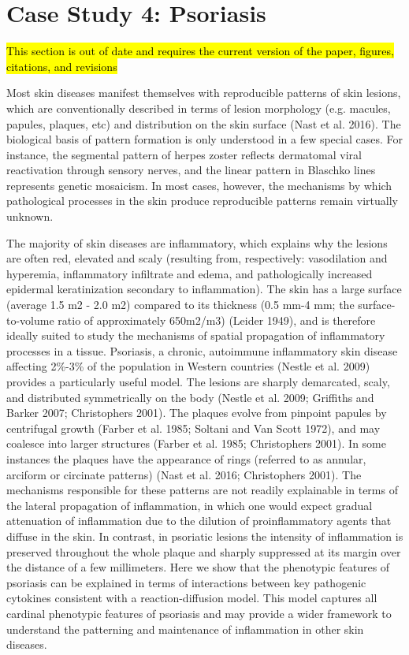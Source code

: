 \chapter{Case Study 4: Psoriasis}

\hl{This section is out of date and requires the current version of the paper, figures, citations, and revisions}

Most skin diseases manifest themselves with reproducible patterns of skin lesions, which are conventionally described in terms of lesion morphology (e.g. macules, papules, plaques, etc) and distribution on the skin surface (Nast et al. 2016). The biological basis of pattern formation is only understood in a few special cases. For instance, the segmental pattern of herpes zoster reflects dermatomal viral reactivation through sensory nerves, and the linear pattern in Blaschko lines represents genetic mosaicism. In most cases, however, the mechanisms by which pathological processes in the skin produce reproducible patterns remain virtually unknown. 

The majority of skin diseases are inflammatory, which explains why the lesions are often red, elevated and scaly (resulting from, respectively:  vasodilation and hyperemia, inflammatory infiltrate and edema, and pathologically increased epidermal keratinization secondary to inflammation). The skin has a large surface (average 1.5 m2 - 2.0 m2) compared to its thickness (0.5 mm-4 mm; the surface-to-volume ratio of approximately 650m2/m3) (Leider 1949), and is therefore ideally suited to study the mechanisms of spatial propagation of inflammatory processes in a tissue. Psoriasis, a chronic, autoimmune inflammatory skin disease affecting 2\%-3\% of the population in Western countries (Nestle et al. 2009) provides a particularly useful model. The lesions are sharply demarcated, scaly, and distributed symmetrically on the body (Nestle et al. 2009; Griffiths and Barker 2007; Christophers 2001). The plaques evolve from pinpoint papules by centrifugal growth (Farber et al. 1985; Soltani and Van Scott 1972), and may coalesce into larger structures (Farber et al. 1985; Christophers 2001). In some instances the plaques have the appearance of rings (referred to as annular, arciform or circinate patterns) (Nast et al. 2016; Christophers 2001). The mechanisms responsible for these patterns are not readily explainable in terms of the lateral propagation of inflammation, in which one would expect gradual attenuation of inflammation due to the dilution of proinflammatory agents that diffuse in the skin. In contrast, in psoriatic lesions the intensity of inflammation is preserved throughout the whole plaque and sharply suppressed at its margin over the distance of a few millimeters. Here we show that the phenotypic features of psoriasis can be explained in terms of interactions between key pathogenic cytokines consistent with a reaction-diffusion model. This model captures all cardinal phenotypic features of psoriasis and may provide a wider framework to understand the patterning and maintenance of inflammation in other skin diseases. 

